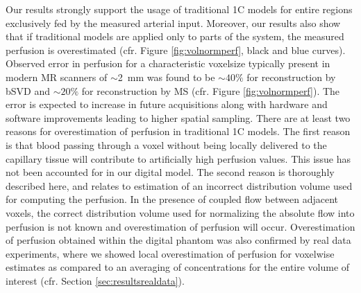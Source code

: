 \documentclass[final,5p,times,twocolumn]{elsarticle}
\begin{document}
	Our results strongly support the usage of traditional 1C models for entire regions exclusively fed by the measured arterial input. Moreover, our results also show that if traditional models are applied only to parts of the system, the measured perfusion is overestimated (cfr. Figure \ref{fig:volnormperf}, black and blue curves). Observed error in perfusion for a characteristic voxelsize typically present in modern MR scanners of $\sim$\SI{2}{\milli\meter} was found to be $\sim$$40\%$ for reconstruction by bSVD and $\sim$$20\%$ for reconstruction by MS (cfr. Figure \ref{fig:volnormperf}). The error is expected to increase in future acquisitions along with hardware and software improvements leading to higher spatial sampling.
	There are at least two reasons for overestimation of perfusion in traditional 1C models. The first reason is that blood passing through a voxel without being locally delivered to the capillary tissue will contribute to artificially high perfusion values. This issue has not been accounted for in our digital model. The second reason is thoroughly described here, and relates to estimation of an incorrect distribution volume used for computing the perfusion. In the presence of coupled flow between adjacent voxels, the correct distribution volume used for normalizing the absolute flow into perfusion is not known and overestimation of perfusion will occur. 
	Overestimation of perfusion obtained within the digital phantom was also confirmed by real data experiments, where we showed local overestimation of perfusion for voxelwise estimates as compared to an averaging of concentrations for the entire volume of interest (cfr. Section \ref{sec:resultsrealdata}). 
	
\end{document}
